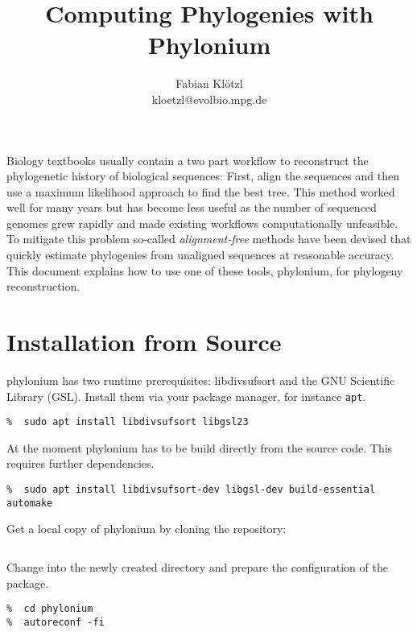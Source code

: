 \documentclass[a4paper,10pt,english]{scrartcl}
\title{Computing Phylogenies with Phylonium}
\author{Fabian Klötzl\\\normalsize{kloetzl@evolbio.mpg.de}}
\date{\isodate{\today}}
\newcommand{\tool}[1]{\textsf{#1}}
\newcommand{\phylonium}{\textsf{phylonium}\xspace}
\begin{document}
\frenchspacing
\maketitle


Biology textbooks usually contain a two part workflow to reconstruct the phylogenetic history of biological sequences: %
First, align the sequences and then use a maximum likelihood approach to find the best tree. This method worked well for many years but has become less useful as the number of sequenced genomes grew rapidly and made existing workflows computationally unfeasible. To mitigate this problem so-called \emph{alignment-free} methods have been devised that quickly estimate phylogenies from unaligned sequences at reasonable accuracy. This document explains how to use one of these tools, \phylonium, for phylogeny reconstruction. 

\section{Installation from Source}

\phylonium has two runtime prerequisites: \tool{libdivsufsort} and the \tool{GNU Scientific Library} (GSL). Install them via your package manager, for instance \lstinline!apt!.

\begin{lstlisting}
%  sudo apt install libdivsufsort libgsl23
\end{lstlisting}

At the moment \phylonium has to be build directly from the source code. This requires further dependencies.

\begin{lstlisting}
%  sudo apt install libdivsufsort-dev libgsl-dev build-essential automake
\end{lstlisting}

Get a local copy of \phylonium by cloning the repository:

\begin{lstlisting}[language=bash]
%  git clone https://github.com/evolbioinf/phylonium
\end{lstlisting}

Change into the newly created directory and prepare the configuration of the package.

\begin{lstlisting}
%  cd phylonium
%  autoreconf -fi
\end{lstlisting}
\end{document}
